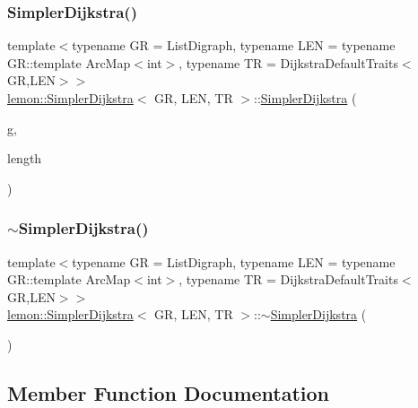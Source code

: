 \subsubsection{\texorpdfstring{Simpler\+Dijkstra()}{SimplerDijkstra()}}
{\footnotesize\ttfamily template$<$typename GR = List\+Digraph, typename L\+EN = typename G\+R\+::template Arc\+Map$<$int$>$, typename TR = Dijkstra\+Default\+Traits$<$\+G\+R,\+L\+E\+N$>$$>$ \\
\hyperlink{classlemon_1_1_simpler_dijkstra}{lemon\+::\+Simpler\+Dijkstra}$<$ GR, L\+EN, TR $>$\+::\hyperlink{classlemon_1_1_simpler_dijkstra}{Simpler\+Dijkstra} (\begin{DoxyParamCaption}\item[{const \hyperlink{classlemon_1_1_simpler_dijkstra_ac19103e2c76d2258f7507dd5921d814d}{Digraph} \&}]{g,  }\item[{const \hyperlink{classlemon_1_1_simpler_dijkstra_adfe5498ef0a7699daf396dd6c4b7dfb6}{Length\+Map} \&}]{length }\end{DoxyParamCaption})\hspace{0.3cm}{\ttfamily [inline]}}

\mbox{\label{classlemon_1_1_simpler_dijkstra_a4f5e5b5fdbdc7bcb61c41cbf6caf4c9f}} 
\subsubsection{\texorpdfstring{$\sim$\+Simpler\+Dijkstra()}{~SimplerDijkstra()}}
{\footnotesize\ttfamily template$<$typename GR = List\+Digraph, typename L\+EN = typename G\+R\+::template Arc\+Map$<$int$>$, typename TR = Dijkstra\+Default\+Traits$<$\+G\+R,\+L\+E\+N$>$$>$ \\
\hyperlink{classlemon_1_1_simpler_dijkstra}{lemon\+::\+Simpler\+Dijkstra}$<$ GR, L\+EN, TR $>$\+::$\sim$\hyperlink{classlemon_1_1_simpler_dijkstra}{Simpler\+Dijkstra} (\begin{DoxyParamCaption}{ }\end{DoxyParamCaption})\hspace{0.3cm}{\ttfamily [inline]}}



\subsection{Member Function Documentation}
\mbox{\label{classlemon_1_1_simpler_dijkstra_a5f76dcaec68bd9b4e9df63a32565ebcc}} 
